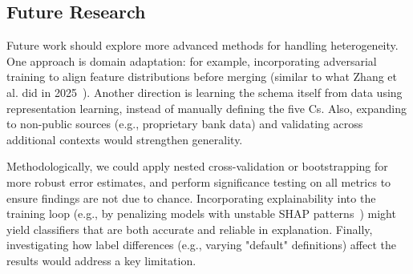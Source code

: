 \documentclass[onecolumn]{IEEEtai}
\begin{document}
\subsection{Future Research}\vspace{-2pt}

Future work should explore more advanced methods for handling heterogeneity. One approach is domain adaptation: for example, incorporating adversarial training to align feature distributions before merging (similar to what Zhang et al. did in 2025~\cite{4}). Another direction is learning the schema itself from data using representation learning, instead of manually defining the five Cs. Also, expanding to non-public sources (e.g., proprietary bank data) and validating across additional contexts would strengthen generality.

Methodologically, we could apply nested cross-validation or bootstrapping for more robust error estimates, and perform significance testing on all metrics to ensure findings are not due to chance. Incorporating explainability into the training loop (e.g., by penalizing models with unstable SHAP patterns~\cite{25}) might yield classifiers that are both accurate and reliable in explanation. Finally, investigating how label differences (e.g., varying "default" definitions) affect the results would address a key limitation.
\end{document}
